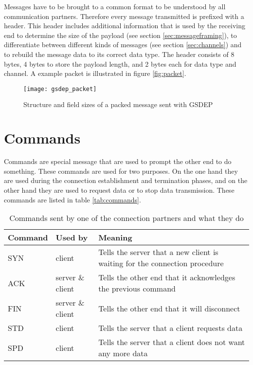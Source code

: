Messages have to be brought to a common format to be understood by all communication partners. Therefore every message transmitted is prefixed with a header. This header includes additional information that is used by the receiving end to determine the size of the payload (see section \vref{sec:messageframing}), to differentiate between different kinds of messages (see section \vref{sec:channels}) and to rebuild the message data to its correct data type. The header consists of 8 bytes, 4 bytes to store the payload length, and 2 bytes each for data type and channel. A example packet is illustrated in figure \vref{fig:packet}.

\begin{figure}[h]
    \centering
    \texttt{[image: gsdep\_packet]}
    \caption{Structure and field sizes of a packed message sent with GSDEP}
    \label{fig:packet}
\end{figure}

\section{Commands}
\label{sec:networking_command}

Commands are special message that are used to prompt the other end to do something. These commands are used for two purposes. On the one hand they are used during the connection establishment and termination phases, and on the other hand they are used to request data or to stop data transmission. These commands are listed in table \vref{tab:commands}.

\begin{table}[h]
    \centering
    \begin{tabular}{| l | l | p{5cm} |}
    \hline
    \textbf{Command} & \textbf{Used by} & \textbf{Meaning} \\ \hline
    SYN & client & Tells the server that a new client is waiting for the connection procedure \\ \hline
    ACK & server \& client & Tells the other end that it acknowledges the previous command \\ \hline
    FIN & server \& client & Tells the other end that it will disconnect \\ \hline
    STD & client & Tells the server that a client requests data\\ \hline
    SPD & client & Tells the server that a client does not want any more data\\
    \hline
    \end{tabular}
    \caption{Commands sent by one of the connection partners and what they do}
    \label{tab:commands}
\end{table}

